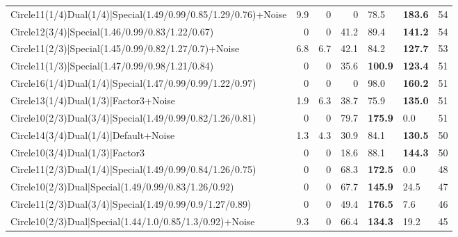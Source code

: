 \begin{tabular}{lrrrllr}
 Circle11(1/4)Dual(1/4)|Special(1.49/0.99/0.85/1.29/0.76)+Noise &          9.9 &            0   &           0   & 78.5           & \textbf{183.6} &           54 \\
 Circle12(3/4)|Special(1.46/0.99/0.83/1.22/0.67)                &          0   &            0   &          41.2 & 89.4           & \textbf{141.2} &           54 \\
 Circle11(2/3)|Special(1.45/0.99/0.82/1.27/0.7)+Noise           &          6.8 &            6.7 &          42.1 & 84.2           & \textbf{127.7} &           53 \\
 Circle11(1/3)|Special(1.47/0.99/0.98/1.21/0.84)                &          0   &            0   &          35.6 & \textbf{100.9} & \textbf{123.4} &           51 \\
 Circle16(1/4)Dual(1/4)|Special(1.47/0.99/0.99/1.22/0.97)       &          0   &            0   &           0   & 98.0           & \textbf{160.2} &           51 \\
 Circle13(1/4)Dual(1/3)|Factor3+Noise                           &          1.9 &            6.3 &          38.7 & 75.9           & \textbf{135.0} &           51 \\
 Circle10(2/3)Dual(3/4)|Special(1.49/0.99/0.82/1.26/0.81)       &          0   &            0   &          79.7 & \textbf{175.9} & 0.0            &           51 \\
 Circle14(3/4)Dual(1/4)|Default+Noise                           &          1.3 &            4.3 &          30.9 & 84.1           & \textbf{130.5} &           50 \\
 Circle10(3/4)Dual(1/3)|Factor3                                 &          0   &            0   &          18.6 & 88.1           & \textbf{144.3} &           50 \\
 Circle11(2/3)Dual(1/4)|Special(1.49/0.99/0.84/1.26/0.75)       &          0   &            0   &          68.3 & \textbf{172.5} & 0.0            &           48 \\
 Circle10(2/3)Dual|Special(1.49/0.99/0.83/1.26/0.92)            &          0   &            0   &          67.7 & \textbf{145.9} & 24.5           &           47 \\
 Circle11(2/3)Dual(3/4)|Special(1.49/0.99/0.9/1.27/0.89)        &          0   &            0   &          49.4 & \textbf{176.5} & 7.6            &           46 \\
 Circle10(2/3)Dual|Special(1.44/1.0/0.85/1.3/0.92)+Noise        &          9.3 &            0   &          66.4 & \textbf{134.3} & 19.2           &           45 \\

\end{tabular}
